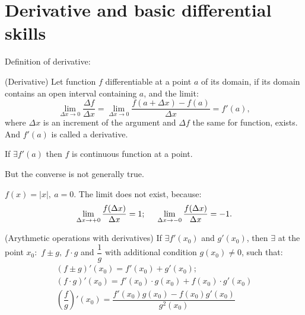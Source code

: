 \section{Derivative and basic differential skills}
Definition of derivative:
\begin{definition}{(Derivative)}{}
    Let function $f$ differentiable at a point $a$ of its domain, if its domain contains an open interval containing $a$, and the limit:
    \[
         \lim\limits_{\Delta x \to 0} \dfrac{\Delta f}{\Delta x} = \lim\limits_{\Delta x \to 0} \dfrac{f(a+\Delta x) - f(a)}{\Delta x} = f'(a), 
    \]
    where $\Delta x$ is an increment of the argument and $\Delta f$ the same for function, exists. And $f'(a)$ is called a derivative.
\end{definition}

\begin{theorema}{}{}
    If $\exists f'(a)$ then $f$ is continuous function at a point.
\end{theorema}

\begin{note}{}{}
    But the converse is not generally true.
\end{note}

\example $f(x) = |x|, \ a = 0.$ The limit does not exist, because:
\[
    \lim\limits_{\Delta x \to +0} \dfrac{f(\Delta x)}{\Delta x} = 1; \hspace*{0.5cm} \lim\limits_{\Delta x \to -0} \dfrac{f(\Delta x)}{\Delta x} = -1.
\]
\begin{theorema}{(Arythmetic operations with derivatives)}{}
    If $\exists f'(x_0)$ and $g'(x_0)$, then $\exists$ at the point $x_0:$ $f\pm g, \ f\cdot g$ and $\dfrac{1}{g}$ with additional condition $g(x_0) \neq 0$, such that:
    \[
        \begin{array}{c}
            (f\pm g)'(x_0) = f'(x_0) + g'(x_0);\\[0.25cm]
            (f\cdot g)' (x_0) = f'(x_0)\cdot g(x_0) + f(x_0)\cdot g'(x_0)\\[0.25cm]
            \left(\dfrac{f}{g}\right)'(x_0) = \dfrac{f'(x_0)g(x_0) - f(x_0)g'(x_0)}{g^2(x_0)}
        \end{array}    
    \]
\end{theorema}

